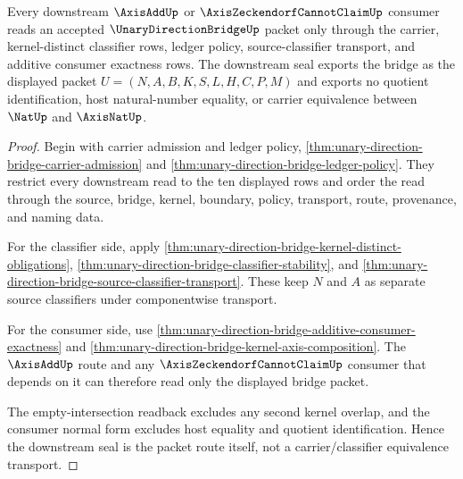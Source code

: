 \begin{theorem}
\label{thm:unary-direction-bridge-downstream-seal}
Every downstream $\AxisAddUp$ or $\AxisZeckendorfCannotClaimUp$ consumer reads an accepted $\UnaryDirectionBridgeUp$ packet only through the carrier, kernel-distinct classifier rows, ledger policy, source-classifier transport, and additive consumer exactness rows. The downstream seal exports the bridge as the displayed packet $U=(N,A,B,K,S,L,H,C,P,M)$ and exports no quotient identification, host natural-number equality, or carrier equivalence between $\NatUp$ and $\AxisNatUp$.
\end{theorem}
\begin{proof}
Begin with carrier admission and ledger policy, \autoref{thm:unary-direction-bridge-carrier-admission} and \autoref{thm:unary-direction-bridge-ledger-policy}. They restrict every downstream read to the ten displayed rows and order the read through the source, bridge, kernel, boundary, policy, transport, route, provenance, and naming data.

For the classifier side, apply \autoref{thm:unary-direction-bridge-kernel-distinct-obligations}, \autoref{thm:unary-direction-bridge-classifier-stability}, and \autoref{thm:unary-direction-bridge-source-classifier-transport}. These keep $N$ and $A$ as separate source classifiers under componentwise transport.

For the consumer side, use \autoref{thm:unary-direction-bridge-additive-consumer-exactness} and \autoref{thm:unary-direction-bridge-kernel-axis-composition}. The $\AxisAddUp$ route and any $\AxisZeckendorfCannotClaimUp$ consumer that depends on it can therefore read only the displayed bridge packet.

The empty-intersection readback excludes any second kernel overlap, and the consumer normal form excludes host equality and quotient identification. Hence the downstream seal is the packet route itself, not a carrier/classifier equivalence transport.
\end{proof}

